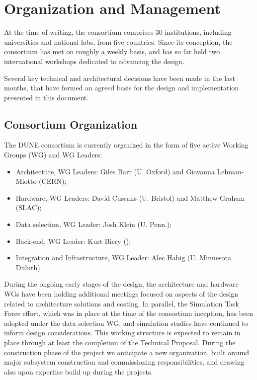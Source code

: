 
\section{Organization and Management}
\label{sec:fd-daq-org}

At the time of writing, the  consortium comprises \num{30} institutions, including universities and national labs, from five countries. Since its conception, the  consortium has met on roughly a weekly basis, and has so far held two international workshops dedicated to advancing the    design.

Several key technical and architectural decisions have been made in the last months, that have formed an agreed basis for the  design and implementation presented in this document.

\subsection{ Consortium Organization}
\label{sec:fd-daq-org-consortium}

The DUNE  consortium is currently organized in the form of five active
Working Groups (WG) and WG Leaders:
\begin{itemize}
\item Architecture, WG Leaders: Giles Barr (U. Oxford) and Giovanna Lehman-Miotto (CERN);
\item Hardware, WG Leaders: David Cussans (U. Bristol) and Matthew Graham (SLAC);
\item Data selection, WG Leader: Josh Klein (U. Penn.);
\item Back-end, WG Leader: Kurt Biery (\fnal);
\item Integration and Infrastructure, WG Leader: Alec Habig
  (U. Minnesota Duluth).
\end{itemize}

During the ongoing early stages of the design, the architecture and hardware WGs have been holding additional meetings focused on aspects of the design related to architecture solutions and costing. In parallel, the  Simulation Task Force effort, which was in place at the time of the consortium inception, has been adopted under the data selection WG, and simulation studies have continued to inform design considerations. This working structure is expected to remain in place through at least the completion of the Technical Proposal. During the construction phase of the project we anticipate a new organization, built around major subsystem construction and commissioning responsibilities, and drawing also upon expertise build up during the  projects.


